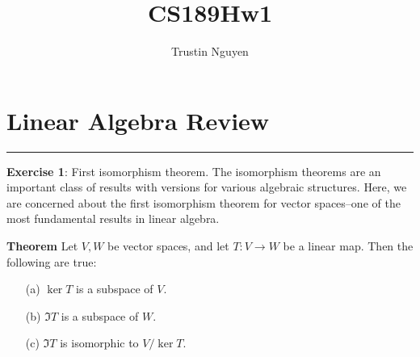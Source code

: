 \documentclass{article}
\title{CS189Hw1}
\author{Trustin Nguyen}
\begin{document}
    \maketitle

\reversemarginpar

\section*{Linear Algebra Review}
\hrule

\textbf{Exercise 1}: First isomorphism theorem. The isomorphism theorems are an important class of results with versions for various algebraic structures. Here, we are concerned about the first isomorphism theorem for vector spaces–one of the most fundamental results in linear algebra.

\textbf{Theorem} Let $V, W$ be vector spaces, and let $T: V \rightarrow W$ be a linear map. Then the following are true:
    \begin{itemize}
        \item [(a)] $\ker{T}$ is a subspace of $V$.

        \item [(b)] $\Im{T}$ is a subspace of $W$.

        \item [(c)] $\Im{T}$ is isomorphic to $V / \ker{T}$. 
    \end{itemize}
\end{document}
